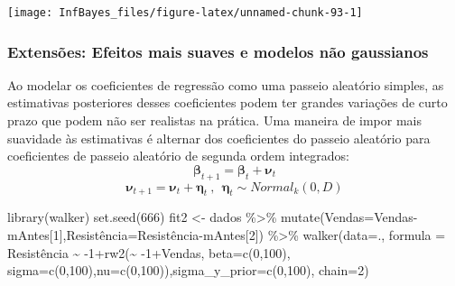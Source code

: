 \documentclass[
]{book}
\newenvironment{Shaded}{\begin{snugshade}}{\end{snugshade}}
\newcommand{\AttributeTok}[1]{\textcolor[rgb]{0.77,0.63,0.00}{#1}}
\newcommand{\DecValTok}[1]{\textcolor[rgb]{0.00,0.00,0.81}{#1}}
\newcommand{\FunctionTok}[1]{\textcolor[rgb]{0.00,0.00,0.00}{#1}}
\newcommand{\NormalTok}[1]{#1}
\newcommand{\OtherTok}[1]{\textcolor[rgb]{0.56,0.35,0.01}{#1}}
\newcommand{\SpecialCharTok}[1]{\textcolor[rgb]{0.00,0.00,0.00}{#1}}
\begin{document}
\begin{center}\texttt{[image: InfBayes\_files/figure-latex/unnamed-chunk-93-1]} \end{center}

\hypertarget{extensuxf5es-efeitos-mais-suaves-e-modelos-nuxe3o-gaussianos}{%
\subsubsection{Extensões: Efeitos mais suaves e modelos não gaussianos}\label{extensuxf5es-efeitos-mais-suaves-e-modelos-nuxe3o-gaussianos}}

Ao modelar os coeficientes de regressão como uma passeio aleatório simples, as estimativas posteriores desses coeficientes podem ter grandes variações de curto prazo que podem não ser realistas na prática. Uma maneira de impor mais suavidade às estimativas é alternar dos coeficientes do passeio aleatório para coeficientes de passeio aleatório de segunda ordem integrados:
\[\boldsymbol\beta_{t+1} = \boldsymbol\beta_t + \boldsymbol\nu_t\]
\[\boldsymbol\nu_{t+1} = \boldsymbol\nu_t + \boldsymbol\eta_t ~,~~ \boldsymbol\eta_t \sim \textit{Normal}_k(0,D)\]

\begin{Shaded}
\begin{Highlighting}[]
\FunctionTok{library}\NormalTok{(walker)}
\FunctionTok{set.seed}\NormalTok{(}\DecValTok{666}\NormalTok{)}
\NormalTok{fit2 }\OtherTok{\textless{}{-}}\NormalTok{ dados }\SpecialCharTok{\%\textgreater{}\%} 
  \FunctionTok{mutate}\NormalTok{(}\AttributeTok{Vendas=}\NormalTok{Vendas}\SpecialCharTok{{-}}\NormalTok{mAntes[}\DecValTok{1}\NormalTok{],Resistência}\OtherTok{=}\NormalTok{Resistência}\SpecialCharTok{{-}}\NormalTok{mAntes[}\DecValTok{2}\NormalTok{]) }\SpecialCharTok{\%\textgreater{}\%}
  \FunctionTok{walker}\NormalTok{(}\AttributeTok{data=}\NormalTok{., }\AttributeTok{formula =}\NormalTok{ Resistência }\SpecialCharTok{\textasciitilde{}} \SpecialCharTok{{-}}\DecValTok{1}\SpecialCharTok{+}\FunctionTok{rw2}\NormalTok{(}\SpecialCharTok{\textasciitilde{}} \SpecialCharTok{{-}}\DecValTok{1}\SpecialCharTok{+}\NormalTok{Vendas, }\AttributeTok{beta=}\FunctionTok{c}\NormalTok{(}\DecValTok{0}\NormalTok{,}\DecValTok{100}\NormalTok{),}
        \AttributeTok{sigma=}\FunctionTok{c}\NormalTok{(}\DecValTok{0}\NormalTok{,}\DecValTok{100}\NormalTok{),}\AttributeTok{nu=}\FunctionTok{c}\NormalTok{(}\DecValTok{0}\NormalTok{,}\DecValTok{100}\NormalTok{)),}\AttributeTok{sigma\_y\_prior=}\FunctionTok{c}\NormalTok{(}\DecValTok{0}\NormalTok{,}\DecValTok{100}\NormalTok{), }\AttributeTok{chain=}\DecValTok{2}\NormalTok{)}
\end{Highlighting}
\end{Shaded}
\end{document}
